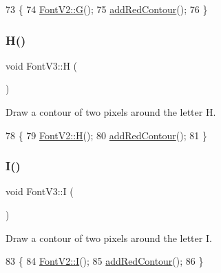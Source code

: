 \begin{DoxyCode}
73                \{
74     \mbox{\hyperlink{class_font_v2_a27ece9cc80af5c5d32cad07f00ed714c}{FontV2::G}}();
75     \mbox{\hyperlink{class_font_v3_a639f1eac0eb6724463813270f47e2696}{addRedContour}}();
76 \}
\end{DoxyCode}
\mbox{\label{class_font_v3_a1baccebcd243a2d49f5b2be99685ce99}} 
\subsubsection{\texorpdfstring{H()}{H()}}
{\footnotesize\ttfamily void Font\+V3\+::H (\begin{DoxyParamCaption}{ }\end{DoxyParamCaption})}



Draw a contour of two pixels around the letter H. 


\begin{DoxyCode}
78                \{
79     \mbox{\hyperlink{class_font_v2_af03f8d436cc22f57b2bdd471b265896e}{FontV2::H}}();
80     \mbox{\hyperlink{class_font_v3_a639f1eac0eb6724463813270f47e2696}{addRedContour}}();
81 \}
\end{DoxyCode}
\mbox{\label{class_font_v3_a0ff9be83c43611b0beffaa2373d35809}} 
\subsubsection{\texorpdfstring{I()}{I()}}
{\footnotesize\ttfamily void Font\+V3\+::I (\begin{DoxyParamCaption}{ }\end{DoxyParamCaption})}



Draw a contour of two pixels around the letter I. 


\begin{DoxyCode}
83                \{
84     \mbox{\hyperlink{class_font_v2_aaace3b75c86f0536789a232f5b38321d}{FontV2::I}}();
85     \mbox{\hyperlink{class_font_v3_a639f1eac0eb6724463813270f47e2696}{addRedContour}}();
86 \}
\end{DoxyCode}
\mbox{\label{class_font_v3_af40c11f0274f7b91ca52abaf8e4a4a6b}} 

